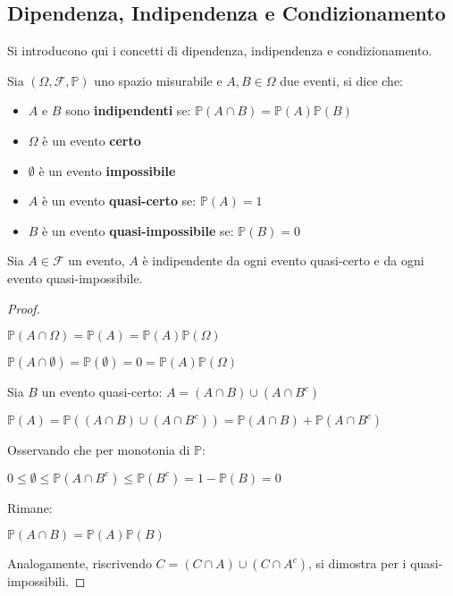 \subsection{Dipendenza, Indipendenza e Condizionamento}
Si introducono qui i concetti di dipendenza, indipendenza e condizionamento.

\begin{definition}
    Sia $(\Omega,\mathscr{F},\mathbb{P})$ uno spazio misurabile e $A,B\in\Omega$ due eventi, si dice che:
    \begin{itemize}
        \item $A$ e $B$ sono \textbf{indipendenti} se: $\mathbb{P}(A\cap B)=\mathbb{P}(A)\mathbb{P}(B)$
        \item $\Omega$ è un evento \textbf{certo}
        \item $\emptyset$ è un evento \textbf{impossibile}
        \item $A$ è un evento \textbf{quasi-certo} se: $\mathbb{P}(A)=1$
        \item $B$ è un evento \textbf{quasi-impossibile} se: $\mathbb{P}(B)=0$
    \end{itemize}
\end{definition}

\begin{proposition}
    Sia $A\in\mathscr{F}$ un evento, $A$ è indipendente da ogni evento quasi-certo e da ogni evento quasi-impossibile.
    
\noindent
\begin{proof}
\begin{center}
    $\mathbb{P}(A\cap\Omega)=\mathbb{P}(A)=\mathbb{P}(A)\mathbb{P}(\Omega)$
\end{center}
\begin{center}
    $\mathbb{P}(A\cap\emptyset)=\mathbb{P}(\emptyset)=0=\mathbb{P}(A)\mathbb{P}(\Omega)$
\end{center}
Sia $B$ un evento quasi-certo: $A=(A\cap B)\cup(A\cap B^c)$
\begin{center}
    $\mathbb{P}(A)=\mathbb{P}((A\cap B)\cup(A\cap B^c))=\mathbb{P}(A\cap B) + \mathbb{P}(A\cap B^c)$
\end{center}
Osservando che per monotonia di $\mathbb{P}$:
\begin{center}
    $0\leq\mathbb{\emptyset}\leq\mathbb{P}(A\cap B^c)\leq\mathbb{P}(B^c)=1-\mathbb{P}(B)=0$
\end{center}
Rimane:
\begin{center}
    $\mathbb{P}(A\cap B)=\mathbb{P}(A)\mathbb{P}(B)$
\end{center}

Analogamente, riscrivendo $C=(C\cap A)\cup(C\cap A^c)$, si dimostra per i quasi-impossibili.
\end{proof}
\end{proposition}


